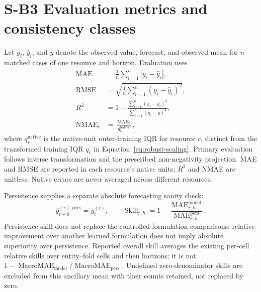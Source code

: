 \documentclass[a4paper,11pt]{article}
\begin{document}
\section*{S-B3 Evaluation metrics and consistency classes}
Let $y_i$, $\widehat{y}_i$, and $\overline{y}$ denote the observed value,
forecast, and observed mean for $n$ matched cases of one resource and horizon.
Evaluation uses
\begin{equation}
  \begin{aligned}
    \operatorname{MAE} &= \frac{1}{n}\sum_{i=1}^{n}|y_i-\widehat{y}_i|, \\
    \operatorname{RMSE} &=
      \sqrt{\frac{1}{n}\sum_{i=1}^{n}(y_i-\widehat{y}_i)^2}, \\
    R^2 &= 1-
      \frac{\sum_{i=1}^{n}(y_i-\widehat{y}_i)^2}
           {\sum_{i=1}^{n}(y_i-\overline{y})^2}, \\
    \operatorname{NMAE}_r &= \frac{\operatorname{MAE}_r}{q_r^{\mathrm{native}}},
  \end{aligned}
  \label{eq:evaluation-metrics}
\end{equation}
where $q_r^{\mathrm{native}}$ is the native-unit outer-training IQR for resource
$r$, distinct from the transformed training IQR $q_r$ in
Equation~\ref{eq:robust-scaling}. Primary evaluation follows inverse
transformation and the prescribed non-negativity projection. MAE and RMSE are
reported in each resource's native units; $R^2$ and NMAE are unitless.  Native
errors are never averaged across different resources.

Persistence supplies a separate absolute forecasting sanity check:
\begin{equation}
  \widehat{y}_{t+h}^{(r),\mathrm{pers}}=y_t^{(r)},
  \qquad
  \operatorname{Skill}_{r,h}
  =1-\frac{\operatorname{MAE}_{r,h}^{\mathrm{model}}}
           {\operatorname{MAE}_{r,h}^{\mathrm{pers}}}.
  \label{eq:persistence-skill}
\end{equation}
Persistence skill does not replace the controlled formulation comparisons:
relative improvement over another learned formulation does not imply absolute
superiority over persistence. Reported overall skill averages the existing
per-cell relative skills over entity--fold cells and then horizons; it is not
$1-\operatorname{MacroMAE}_{\mathrm{model}}/
\operatorname{MacroMAE}_{\mathrm{pers}}$. Undefined zero-denominator skills
are excluded from this ancillary mean with their counts retained, not
replaced by zero.
\end{document}
